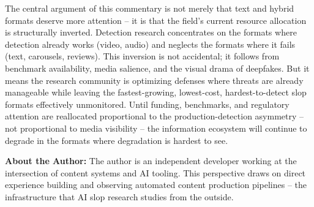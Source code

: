 \documentclass[12pt]{article}
\begin{document}
The central argument of this commentary is not merely that text and hybrid formats deserve more attention -- it is that the field's current resource allocation is structurally inverted. Detection research concentrates on the formats where detection already works (video, audio) and neglects the formats where it fails (text, carousels, reviews). This inversion is not accidental; it follows from benchmark availability, media salience, and the visual drama of deepfakes. But it means the research community is optimizing defenses where threats are already manageable while leaving the fastest-growing, lowest-cost, hardest-to-detect slop formats effectively unmonitored. Until funding, benchmarks, and regulatory attention are reallocated proportional to the production-detection asymmetry -- not proportional to media visibility -- the information ecosystem will continue to degrade in the formats where degradation is hardest to see.

\vspace{1em}
\noindent\textbf{About the Author:} The author is an independent developer working at the intersection of content systems and AI tooling. This perspective draws on direct experience building and observing automated content production pipelines -- the infrastructure that AI slop research studies from the outside.
\end{document}
